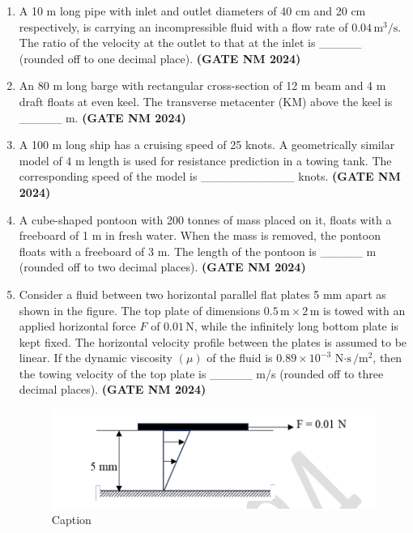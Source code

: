 \documentclass[journal,15pt,onecolumn]{IEEEtran}
\theoremstyle{remark}
\begin{document}
\begin{enumerate}
    \item A 10 m long pipe with inlet and outlet diameters of 40 cm and 20 cm respectively, 
    is carrying an incompressible fluid with a flow rate of $0.04 \, \text{m}^3/\text{s}$. 
    The ratio of the velocity at the outlet to that at the inlet is \_\_\_\_\_ (rounded off to one decimal place).\hfill \textbf{ (GATE NM 2024)}



 \item An 80 m long barge with rectangular cross-section of 12 m beam and 4 m draft floats at even keel. 
    The transverse metacenter (KM) above the keel is \_\_\_\_\_ m.\hfill \textbf{ (GATE NM 2024)}

    \item A 100 m long ship has a cruising speed of 25 knots. 
    A geometrically similar model of 4 m length is used for resistance prediction in a towing tank. 
    The corresponding speed of the model is \_\_\_\_\_\_\_\_\_\_\_ knots.\hfill \textbf{ (GATE NM 2024)}

    \item A cube-shaped pontoon with 200 tonnes of mass placed on it, floats with a freeboard of 1 m in fresh water. 
    When the mass is removed, the pontoon floats with a freeboard of 3 m. 
    The length of the pontoon is \_\_\_\_\_ m (rounded off to two decimal places).\hfill \textbf{ (GATE NM 2024)}


 \item Consider a fluid between two horizontal parallel flat plates 5 mm apart as shown in the figure. 
    The top plate of dimensions $0.5 \, \text{m} \times 2 \, \text{m}$ is towed with an applied horizontal force $F$ of $0.01 \, \text{N}$, 
    while the infinitely long bottom plate is kept fixed. 
    The horizontal velocity profile between the plates is assumed to be linear. 
    If the dynamic viscosity $(\mu)$ of the fluid is $0.89 \times 10^{-3} \, \text{N$\cdot$s}/\text{m}^2$, 
    then the towing velocity of the top plate is \_\_\_\_\_ m/s (rounded off to three decimal places).\hfill \textbf{ (GATE NM 2024)}


\begin{figure}[h!]
    \centering
    \includegraphics[width=0.8\linewidth]{figures.tex/Screenshot 2025-08-21 112416.png}
    \caption{Caption}
    \label{fig:placeholder}
\end{figure}




\end{enumerate}
\end{document}
